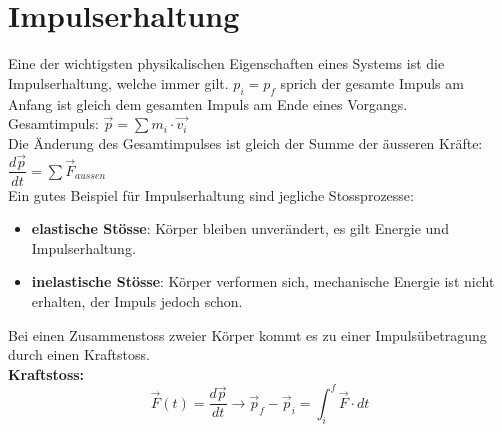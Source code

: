 \documentclass[12pt]{article}
\begin{document}
\section{Impulserhaltung}
Eine der wichtigsten physikalischen Eigenschaften eines Systems ist die Impulserhaltung, welche immer gilt. $p_i = p_f$ sprich der gesamte Impuls am Anfang ist gleich dem gesamten Impuls am Ende eines Vorgangs.\\
Gesamtimpuls: $\vec{p} = \sum m_i \cdot \vec{v_i}$\\
Die Änderung des Gesamtimpulses ist gleich der Summe der äusseren Kräfte:$\dfrac{d\vec{p}}{dt} = \sum \vec{F}_{aussen}$
\\
Ein gutes Beispiel für Impulserhaltung sind jegliche Stossprozesse:
\begin{itemize}
\item \textbf{elastische Stösse}: Körper bleiben unverändert, es gilt Energie und Impulserhaltung.

\item \textbf{inelastische Stösse}: Körper verformen sich, mechanische Energie ist nicht erhalten, der Impuls jedoch schon.
\end{itemize}

Bei einen Zusammenstoss zweier Körper kommt es zu einer Impulsübetragung durch einen Kraftstoss.\\
\textbf{Kraftstoss:}
\begin{equation}
\vec{F}(t) = \dfrac{d\vec{p}}{dt} \rightarrow \vec{p}_f-\vec{p}_i = \int_i^f \vec{F} \cdot dt
\end{equation}
\end{document}
